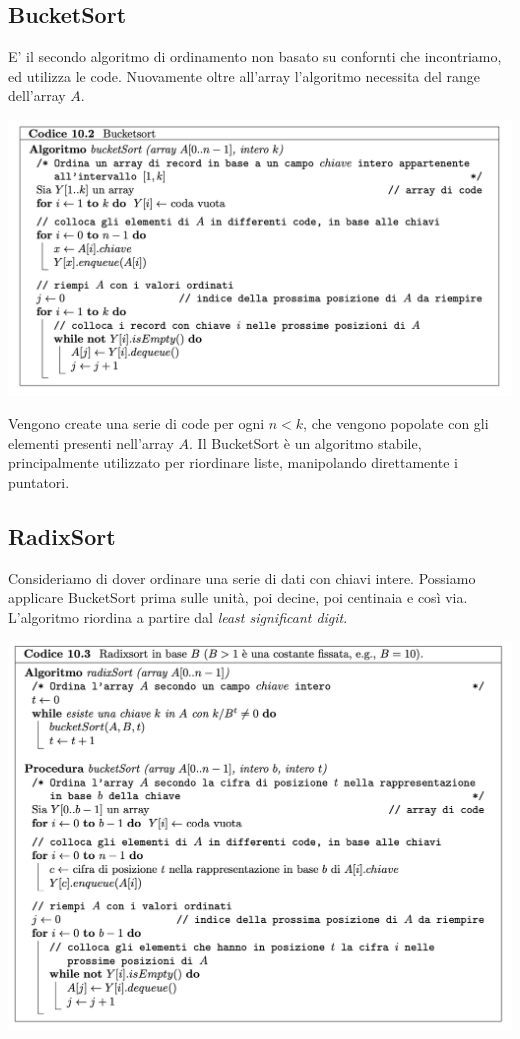 \documentclass[11pt, oneside]{article}   	%
\begin{document}
\subsection*{BucketSort}
E' il secondo algoritmo di ordinamento non basato su confornti che incontriamo, ed utilizza le code. Nuovamente oltre all'array l'algoritmo necessita del range dell'array $A$. 
\begin{center}
\includegraphics[scale=0.7]{bucket}
\end{center}
Vengono create una serie di code per ogni $n < k$, che vengono popolate con gli elementi presenti nell'array $A$. Il BucketSort è un algoritmo stabile, principalmente utilizzato per riordinare liste, manipolando direttamente i puntatori.
\subsection*{RadixSort}
Consideriamo di dover ordinare una serie di dati con chiavi intere. Possiamo applicare BucketSort prima sulle unità, poi decine, poi centinaia e così via. L'algoritmo riordina a partire dal \emph{least significant digit}. 
 \begin{center}
\includegraphics[scale=0.7]{radix}
\end{center}
\end{document}
